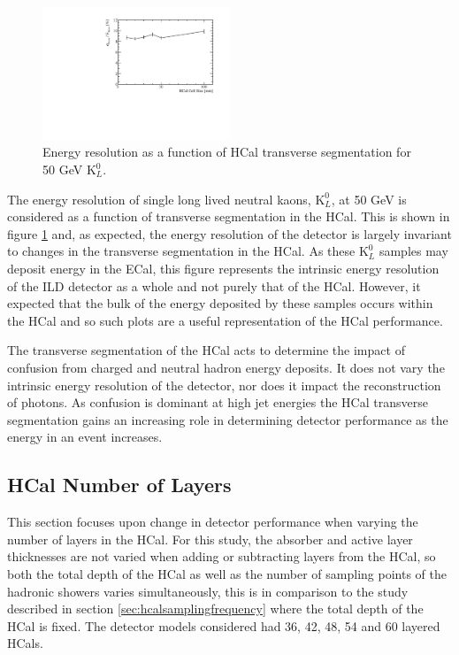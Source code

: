 \begin{figure}
\centering
\includegraphics[width=0.5\textwidth]{OptimisationStudies/Plots/EnergyResolution/ER_vs_HCalCellSize_50GeVKaon0L.pdf}
\caption[Energy resolution as a function of HCal transverse segmentation for 50 GeV $\text{K}^{0}_{L}$.]{Energy resolution as a function of HCal transverse segmentation for 50 GeV $\text{K}^{0}_{L}$.}
\label{fig:hcalcellskaon}
\end{figure}

The energy resolution of single long lived neutral kaons, $\text{K}^{0}_{L}$, at 50 GeV is considered as a function of transverse segmentation in the HCal.  This is shown in figure \ref{fig:hcalcellskaon} and, as expected, the energy resolution of the detector is largely invariant to changes in the transverse segmentation in the HCal.  As these $\text{K}^{0}_{L}$ samples may deposit energy in the ECal, this figure represents the intrinsic energy resolution of the ILD detector as a whole and not purely that of the HCal.  However, it expected that the bulk of the energy deposited by these samples occurs within the HCal and so such plots are a useful representation of the HCal performance.  

The transverse segmentation of the HCal acts to determine the impact of confusion from charged and neutral hadron energy deposits.  It does not vary the intrinsic energy resolution of the detector, nor does it impact the reconstruction of photons.  As confusion is dominant at high jet energies the HCal transverse segmentation gains an increasing role in determining detector performance as the energy in an event increases. 


\subsection{HCal Number of Layers}
\label{sec:hcalnlayers}

This section focuses upon change in detector performance when varying the number of layers in the HCal.  For this study, the absorber and active layer thicknesses are not varied when adding or subtracting layers from the HCal, so both the total depth of the HCal as well as the number of sampling points of the hadronic showers varies simultaneously, this is in comparison to the study described in section \ref{sec:hcalsamplingfrequency} where the total depth of the HCal is fixed.  The detector models considered had 36, 42, 48, 54 and 60 layered HCals.  

